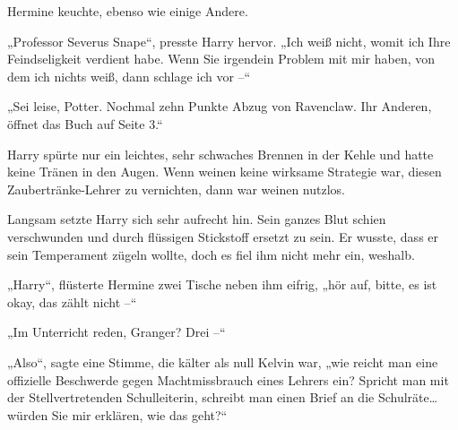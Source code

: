 Hermine keuchte, ebenso wie einige Andere.

„Professor Severus Snape“, presste Harry hervor. „Ich weiß nicht, womit ich Ihre Feindseligkeit verdient habe. Wenn Sie irgendein Problem mit mir haben, von dem ich nichts weiß, dann schlage ich vor –“

„Sei leise, Potter. Nochmal zehn Punkte Abzug von Ravenclaw. Ihr Anderen, öffnet das Buch auf Seite 3.“

Harry spürte nur ein leichtes, sehr schwaches Brennen in der Kehle und hatte keine Tränen in den Augen. Wenn weinen keine wirksame Strategie war, diesen Zaubertränke-Lehrer zu vernichten, dann war weinen nutzlos.

Langsam setzte Harry sich sehr aufrecht hin. Sein ganzes Blut schien verschwunden und durch flüssigen Stickstoff ersetzt zu sein. Er wusste, dass er sein Temperament zügeln wollte, doch es fiel ihm nicht mehr ein, weshalb.

„Harry“, flüsterte Hermine zwei Tische neben ihm eifrig, „hör auf, bitte, es ist okay, das zählt nicht –“

„Im Unterricht reden, Granger? Drei –“

„Also“, sagte eine Stimme, die kälter als null Kelvin war, „wie reicht man eine offizielle Beschwerde gegen Machtmissbrauch eines Lehrers ein? Spricht man mit der Stellvertretenden Schulleiterin, schreibt man einen Brief an die Schulräte…würden Sie mir erklären, wie das geht?“

